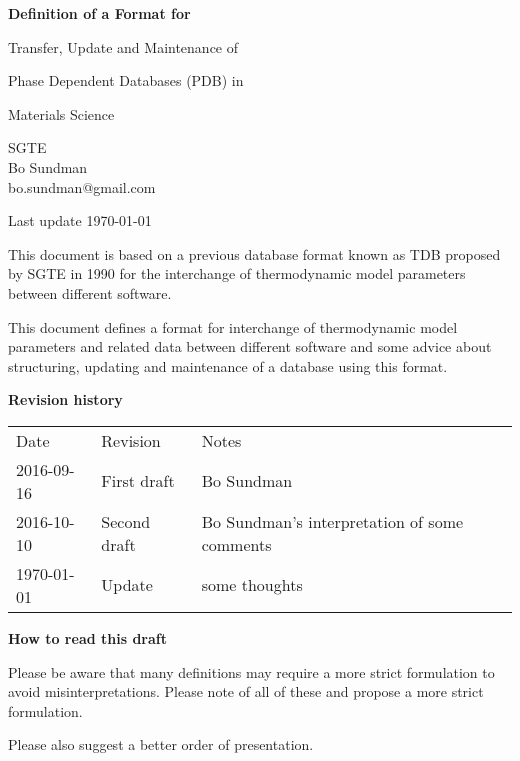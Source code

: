 \documentclass[12pt]{article}
\begin{document}
\begin{center}

\vspace{30mm}

{\Large \bf Definition of a Format for

Transfer, Update and Maintenance of

Phase Dependent Databases (PDB) in

Materials Science

}

\vspace{20mm}

SGTE\\
Bo Sundman\\
bo.sundman@gmail.com

\vspace{120mm}

Last update \today
\end{center}

\newpage

This document is based on a previous database format known as TDB
proposed by SGTE in 1990 for the interchange of thermodynamic model
parameters between different software.

This document defines a format for interchange of thermodynamic model
parameters and related data between different software and some advice
about structuring, updating and maintenance of a database using this
format.

\vspace{5mm}
{\bf Revision history}

\begin{tabular}{lll}
Date       & Revision    &  Notes \\
2016-09-16 & First draft & Bo Sundman\\
2016-10-10 & Second draft & Bo Sundman's interpretation of some comments\\
\today     & Update      & some thoughts\\
\end{tabular}

\vspace{5mm}

{\bf How to read this draft}

\bigskip

Please be aware that many definitions may require a more strict
formulation to avoid misinterpretations.  Please note of all of these
and propose a more strict formulation.

Please also suggest a better order of presentation.
\end{document}
